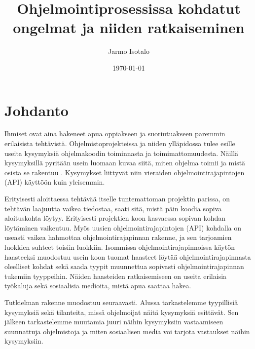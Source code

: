 \documentclass[finnish]{../tktltiki2}
\title{Ohjelmointiprosessissa kohdatut ongelmat ja niiden ratkaiseminen}
\author{Jarmo Isotalo}
\date{\today}
\theoremstyle{definition}
\theoremstyle{remark}
\begin{document}

\frontmatter      %

\maketitle        %
\makeabstract     %

\tableofcontents  %


\mainmatter       %

\section{Johdanto}
Ihmiset ovat aina hakeneet apua oppiakseen ja suoriutuakseen paremmin erilaisista tehtävistä. %
Ohjelmistoprojekteissa ja niiden ylläpidossa tulee esille useita kysymyksiä ohjelmakoodin toiminnasta ja toimimattomuudesta. Näillä kysymyksillä pyritään usein luomaan kuvaa siitä, miten ohjelma toimii ja  mistä osista se rakentuu \cite{g_search_code, questions-during-software-evolution-tasks,asking-and-answering-api-questions}.
Kysymykset liittyvät niin vieraiden ohjelmointirajapintojen (API) käyttöön \cite{jungloid-mining} kuin yleisemmin.

Erityisesti aloittaessa tehtävää itselle tuntemattoman projektin parissa, on tehtävän laajuutta vaikea tiedostaa, saati sitä, mistä päin koodia sopiva aloituskohta löytyy. Erityisesti projektien koon kasvaessa sopivan kohdan löytäminen vaikeutuu.
Myös uusien ohjelmointirajapintojen (API) kohdalla on useasti vaikea hahmottaa ohjelmointirajapinnan rakenne, ja sen tarjoamien luokkien suhteet toisiin luokkiin. Isommissa ohjelmointirajapinnoissa käytön haasteeksi muodostuu usein koon tuomat haasteet löytää ohjelmointirajapinnasta oleelliset kohdat sekä saada tyypit muunnettua sopivasti ohjelmointirajapinnan tukemiin tyyppeihin.
Näiden haasteiden ratkaisemiseen on useita erilaisia työkaluja sekä sosiaalisia medioita, mistä apua saattaa hakea.

Tutkielman rakenne muodostuu seuraavasti. Alussa tarkastelemme tyypillisiä kysymyksiä sekä tilanteita, missä ohjelmoijat näitä kysymyksiä esittävät. Sen jälkeen tarkastelemme muutamia juuri näihin kysymyksiin vastaamiseen suunnattuja ohjelmistoja ja miten sosiaalisen media voi tarjota vastaukset näihin kysymyksiin.
\end{document}
